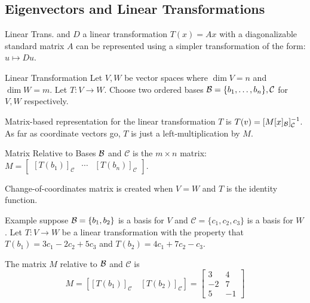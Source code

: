\begin{card}
    \subsection{Eigenvectors and Linear Transformations}

    \begin{compactdesc}
    \item[Linear Trans. and $D$] a linear transformation $T(x) = Ax$
        with a diagonalizable standard matrix $A$
        can be represented using a simpler transformation of the form:
        $u \mapsto Du$.
    \item[Linear Transformation] Let $V, W$ be vector spaces where
        $\dim V = n$ and $\dim W = m$. Let $T: V \to W$. Choose two ordered
        bases $\mathcal{B} = \{b_1, \dotsc, b_n\}, \mathcal{C}$ for $V,W$ respectively.

    \item[Matrix-based] representation for the linear transformation $T$ is
        $T(v) = [M[x]_{\mathcal{B}}]_\mathcal{C}^{-1}$. As far as coordinate vectors go,
        $T$ is just a left-multiplication by $M$.
    \item[Matrix Relative to Bases] $\mathcal{B}$ and $\mathcal{C}$ is the $m \times n$
        matrix:
        $M = \begin{bmatrix}
        [T(b_1)]_\mathcal{C} & \cdots & [T(b_n)]_\mathcal{C}
        \end{bmatrix}$.
    \item[Change-of-coordinates] matrix is created when $V=W$ and
        $T$ is the identity function.
    \item[Example] suppose $\mathcal{B} = \{b_1, b_2\}$ is a basis for $V$ and
        $\mathcal{C} = \{c_1, c_2, c_3\}$ is a basis for $W$. Let
        $T : V \to W$ be a linear transformation with the property that
        $T(b_1) = 3c_1 - 2c_2 + 5c_3$ and $T(b_2) = 4c_1 + 7c_2 - c_3$.

        The matrix $M$ relative to $\mathcal{B}$ and $\mathcal{C}$ is
        $$
        M = [[T(b_1)]_\mathcal{C} \quad [T(b_2)]_\mathcal{C}]
        = \begin{bmatrix} 3 & 4 \\ -2 & 7 \\ 5 & -1 \end{bmatrix}
        $$
\end{compactdesc}
\end{card}

